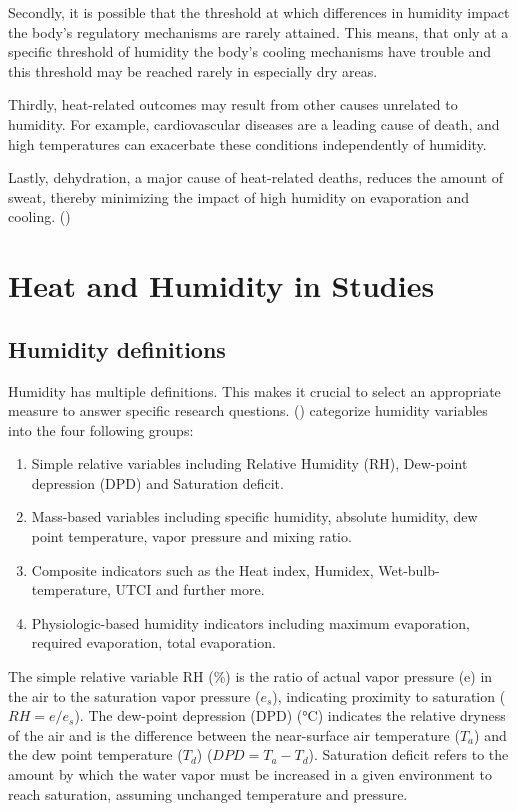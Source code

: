 \documentclass[
]{krantz}
\providecommand{\tightlist}{%
  \setlength{\itemsep}{0pt}\setlength{\parskip}{0pt}}
\begin{document}
Secondly, it is possible that the threshold at which differences in humidity impact the body's regulatory mechanisms are rarely attained. This means, that only at a specific threshold of humidity the body's cooling mechanisms have trouble and this threshold may be reached rarely in especially dry areas.

Thirdly, heat-related outcomes may result from other causes unrelated to humidity. For example, cardiovascular diseases are a leading cause of death, and high temperatures can exacerbate these conditions independently of humidity.

Lastly, dehydration, a major cause of heat-related deaths, reduces the amount of sweat, thereby minimizing the impact of high humidity on evaporation and cooling. (\citet{bald})

\section{Heat and Humidity in Studies}\label{heat-and-humidity-in-studies}

\subsection{Humidity definitions}\label{humidity-definitions}

Humidity has multiple definitions. This makes it crucial to select an appropriate measure to answer specific research questions. (\citet{bald}) categorize humidity variables into the four following groups:

\begin{enumerate}
\def\labelenumi{\arabic{enumi}.}
\tightlist
\item
  Simple relative variables including Relative Humidity (RH), Dew-point depression (DPD) and Saturation deficit.\\
\item
  Mass-based variables including specific humidity, absolute humidity, dew point temperature, vapor pressure and mixing ratio.\\
\item
  Composite indicators such as the Heat index, Humidex, Wet-bulb-temperature, UTCI and further more.\\
\item
  Physiologic-based humidity indicators including maximum evaporation, required evaporation, total evaporation.
\end{enumerate}

The simple relative variable RH (\%) is the ratio of actual vapor pressure (e) in the air to the saturation vapor pressure (\(e_s\)), indicating proximity to saturation (\(RH=e/e_s\)). The dew-point depression (DPD) (°C) indicates the relative dryness of the air and is the difference between the near-surface air temperature (\(T_a\)) and the dew point temperature (\(T_d\)) (\(DPD=T_a-T_d\)). Saturation deficit refers to the amount by which the water vapor must be increased in a given environment to reach saturation, assuming unchanged temperature and pressure.
\end{document}
